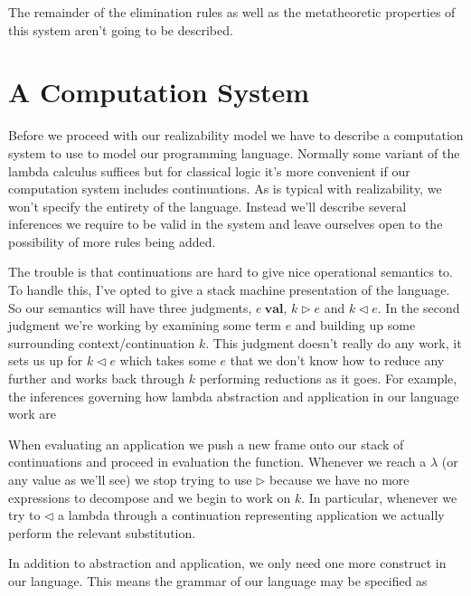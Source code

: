 \documentclass{amsart}
\newcommand{\val}[1]{#1\ \mathbf{val}}
\newcommand{\push}{\rhd}
\newcommand{\pull}{\lhd}
\newcommand{\ap}[1]{\mathtt{ap}(-;\ #1)}
\begin{document}
The remainder of the elimination rules as well as the metatheoretic
properties of this system aren't going to be described.

\section{A Computation System}

Before we proceed with our realizability model we have to describe a
computation system to use to model our programming language. Normally
some variant of the lambda calculus suffices but for classical logic
it's more convenient if our computation system includes
continuations. As is typical with realizability, we
won't specify the entirety of the language. Instead we'll describe
several inferences we require to be valid in the system and leave
ourselves open to the possibility of more rules being added.

The trouble is that continuations are hard to give nice operational
semantics to. To handle this, I've opted to give a stack machine
presentation of the language. So our semantics will have three
judgments, $\val{e}$, $k \push e$ and $k \pull e$. In the second
judgment we're working by examining some term $e$ and building up some
surrounding context/continuation $k$. This judgment doesn't really do
any work, it sets us up for $k \pull e$ which takes some $e$ that we
don't know how to reduce any further and works back through $k$
performing reductions as it goes. For example, the inferences
governing how lambda abstraction and application in our language work
are


When evaluating an application we push a new frame onto our stack of
continuations and proceed in evaluation the function. Whenever we
reach a $\lambda$ (or any value as we'll see) we stop trying to use
$\push$ because we have no more expressions to decompose and we begin
to work on $k$. In particular, whenever we try to $\pull$ a lambda
through a continuation representing application we actually perform
the relevant substitution.

In addition to abstraction and application, we only need one more
construct in our language. This means the grammar of our language may
be specified as
\end{document}
